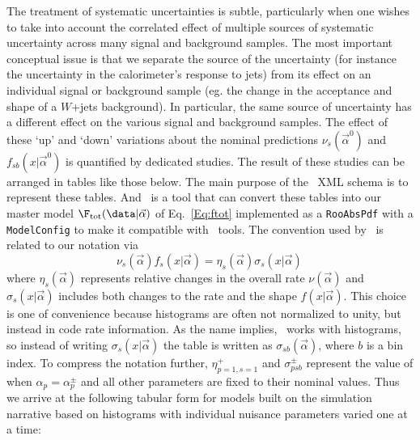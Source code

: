 The treatment of systematic uncertainties is subtle, particularly when one wishes to take into account the correlated effect of multiple sources of systematic uncertainty across many signal and background samples.   
The most important conceptual issue is that we separate the source of the uncertainty (for instance the uncertainty in the calorimeter's response to jets) from its effect on an individual signal or background sample (eg. the change in the acceptance and shape of a $W$+jets background).  In particular, the same source of uncertainty has a different effect on the various signal and background samples.  The effect of these `up' and `down' variations about the nominal predictions $\nu_s(\vec\alpha^0)$  and $f_{sb}(x|\vec\alpha^0)$ is quantified by dedicated studies.   The result of these studies can be arranged in tables like those below.  The main purpose of the \HF\ XML schema is to represent these tables.  And \HF\ is a tool that can convert these tables into our master model $\F_{\rm tot}(\data |\vec\alpha)$ of Eq.~\ref{Eq:ftot} implemented as a  \texttt{RooAbsPdf} with a  \texttt{ModelConfig} to make it compatible with \roostats\ tools.  The convention used by \HF\ is related to our notation via 
\begin{equation}
\nu_s(\vec\alpha) f_s(x|\vec\alpha) = \eta_{s}(\vec\alpha) \sigma_{s}(x|\vec\alpha) \, 
\end{equation}
where  $\eta_{s}(\vec\alpha)$ represents relative changes in the overall rate $\nu(\vec\alpha)$  and $\sigma_{s}(x|\vec\alpha)$ includes both changes to the rate and the shape $f(x|\vec\alpha)$.  This choice is one of convenience because histograms are often not normalized to unity, but instead in code rate information.  As the name implies, \HF\ works with histograms, so instead of writing $\sigma_{s}(x|\vec\alpha)$ the table is written as $\sigma_{sb}(\vec\alpha)$, where $b$ is a bin index. To compress the notation further, $\eta_{p=1,s=1}^+$ and $\sigma_{psb}^\pm$ represent the value of when $\alpha_p=\alpha_p^\pm$ and all other parameters are fixed to their nominal values.  Thus we arrive at the following tabular form for models built on the simulation narrative based on histograms with individual nuisance parameters varied one at a time:
